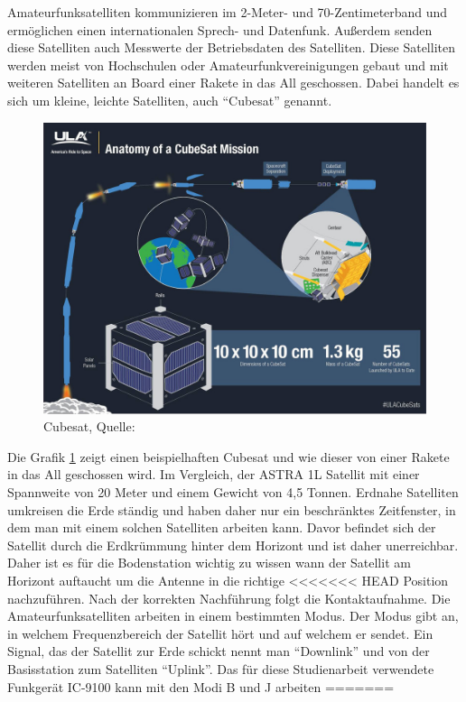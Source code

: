 Amateurfunksatelliten kommunizieren im 2-Meter- und 70-Zentimeterband \cite{Wiki:amateur} und ermöglichen einen 
internationalen Sprech- und Datenfunk. Außerdem senden diese Satelliten
auch Messwerte der Betriebsdaten des Satelliten. Diese Satelliten werden meist von Hochschulen oder Amateurfunkvereinigungen gebaut und mit weiteren 
Satelliten an Board einer Rakete in das All geschossen. Dabei handelt es sich um kleine, leichte Satelliten, auch ``Cubesat'' genannt.
\clearpage
\begin{figure}[h]
 \centering
 \includegraphics[width=0.8\linewidth]{./images/cubesat}
 \caption{Cubesat, Quelle: \cite{cubesat}}
 \label{fig:cubesat}
\end{figure}
Die Grafik \ref{fig:cubesat} zeigt einen beispielhaften Cubesat und wie dieser von einer Rakete in 
das All geschossen wird. Im Vergleich, der ASTRA 1L Satellit mit 
einer Spannweite von 20 Meter und einem Gewicht von 4,5 Tonnen. Erdnahe Satelliten umkreisen die 
Erde ständig und haben daher nur ein beschränktes 
Zeitfenster, in dem man mit einem solchen Satelliten arbeiten kann. Davor befindet sich der Satellit durch die Erdkrümmung hinter dem Horizont und 
ist daher unerreichbar. Daher ist es für die Bodenstation wichtig zu wissen wann der Satellit am Horizont auftaucht um die Antenne in die richtige 
<<<<<<< HEAD
Position nachzuführen. Nach der korrekten Nachführung folgt die Kontaktaufnahme. Die Amateurfunksatelliten arbeiten in einem bestimmten Modus. 
Der Modus gibt an, in welchem Frequenzbereich der Satellit hört und auf welchem er sendet. Ein Signal,
das der Satellit zur Erde schickt nennt man ``Downlink'' und von der Basisstation zum Satelliten ``Uplink''. Das für diese Studienarbeit 
verwendete Funkgerät IC-9100 kann mit den Modi B und J arbeiten \cite[S.153]{radiomanual}
=======
